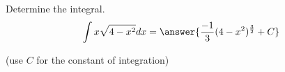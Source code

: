 \documentclass{ximera}
\author{Jason Miller}
\begin{document}
\begin{exercise}
Determine the integral.
\[
\int x\sqrt{4-x^{2}} dx=\answer{ \frac{-1}{3}(4-x^{2})^{\frac{3}{2}}     +C   }
\]

(use $C$ for the constant of integration)


\end{exercise}
\end{document}

